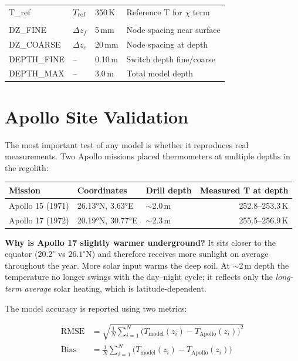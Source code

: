 \documentclass[12pt, a4paper]{article}
\begin{document}
\begin{center}
\begin{tabular}{>{\ttfamily}l l l p{5.5cm}}
T\_ref     & $T_{\rm ref}$ & 350\,K                    & Reference T for $\chi$ term \\[6pt]
\multicolumn{4}{l}{\itshape Numerical grid} \\[2pt]
DZ\_FINE   & $\Delta z_f$  & 5\,mm    & Node spacing near surface \\
DZ\_COARSE & $\Delta z_c$  & 20\,mm   & Node spacing at depth \\
DEPTH\_FINE& --            & 0.10\,m  & Switch depth fine/coarse \\
DEPTH\_MAX & --            & 3.0\,m   & Total model depth \\
\bottomrule
\end{tabular}
\end{center}

\section{Apollo Site Validation}

The most important test of any model is whether it reproduces
real measurements.
Two Apollo missions placed thermometers at multiple depths in
the regolith:

\begin{center}
\begin{tabular}{lllr}
\toprule
Mission & Coordinates & Drill depth & Measured T at depth \\
\midrule
Apollo 15 (1971) & 26.13°N, 3.63°E  & $\sim$2.0\,m & 252.8--253.3\,K \\
Apollo 17 (1972) & 20.19°N, 30.77°E & $\sim$2.3\,m & 255.5--256.9\,K \\
\bottomrule
\end{tabular}
\end{center}

\begin{plainbox}
  \textbf{Why is Apollo 17 slightly warmer underground?}
  It sits closer to the equator ($20.2^{\circ}$ vs $26.1^{\circ}$N)
  and therefore receives more sunlight on average throughout the
  year.
  More solar input warms the deep soil.
  At $\sim$2\,m depth the temperature no longer swings with the
  day--night cycle; it reflects only the \emph{long-term average}
  solar heating, which is latitude-dependent.
\end{plainbox}

The model accuracy is reported using two metrics:

\begin{align}
  \mathrm{RMSE} &= \sqrt{\frac{1}{N}\sum_{i=1}^{N}
    \bigl(T_{\mathrm{model}}(z_i) - T_{\mathrm{Apollo}}(z_i)\bigr)^2}
  \label{eq:rmse}\\[6pt]
  \mathrm{Bias} &= \frac{1}{N}\sum_{i=1}^{N}
    \bigl(T_{\mathrm{model}}(z_i) - T_{\mathrm{Apollo}}(z_i)\bigr)
  \label{eq:bias}
\end{align}
\end{document}
